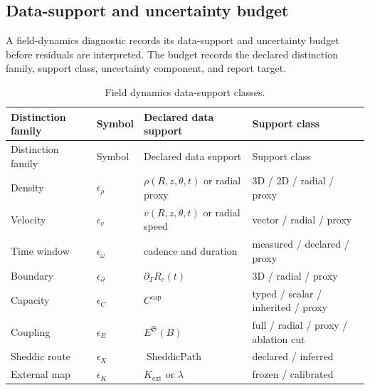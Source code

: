 

\subsection{Data-support and uncertainty budget}\label{manual:field-dynamics-data-support-budget}
A field-dynamics diagnostic records its data-support and uncertainty budget before residuals are interpreted. The budget records the declared distinction family, support class, uncertainty component, and report target.

\scriptsize
\begin{longtable}{@{}p{}p{}p{}p{}@{}}
\caption{Field dynamics data-support classes.}\label{tab:field-dynamics-data-support-budget-a}\\
\toprule
Distinction family & Symbol & Declared data support & Support class\\
\midrule
\endfirsthead
\toprule
Distinction family & Symbol & Declared data support & Support class\\
\midrule
\endhead
Density & \(\epsilon_\rho\) & \(\rho(R,z,\theta,t)\) or radial proxy & 3D / 2D / radial / proxy\\
Velocity & \(\epsilon_v\) & \(v(R,z,\theta,t)\) or radial speed & vector / radial / proxy\\
Time window & \(\epsilon_\omega\) & cadence and duration & measured / declared / proxy\\
Boundary & \(\epsilon_{\partial}\) & \(\partial_T R_c(t)\) & 3D / radial / proxy\\
Capacity & \(\epsilon_C\) & \(C^{\mathrm{cap}}\) & typed / scalar / inherited / proxy\\
Coupling & \(\epsilon_E\) & \(E^{\mathfrak S}(B)\) & full / radial / proxy / ablation cut\\
Sheddic route & \(\epsilon_X\) & \(\operatorname{SheddicPath}\) & declared / inferred\\
External map & \(\epsilon_K\) & \(K_{\mathrm{ext}}\) or \(\lambda\) & frozen / calibrated\\
\bottomrule
\end{longtable}

